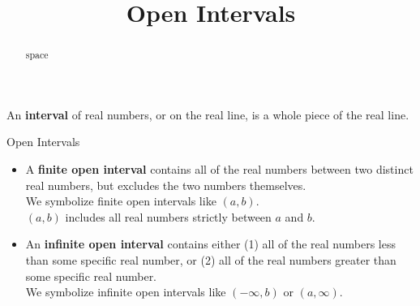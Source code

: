 \documentclass{ximera}
\title{Open Intervals}
\begin{document}
\begin{abstract}
space
\end{abstract}
\maketitle




An \textbf{interval} of real numbers, or on the real line, is a whole piece of the real line.


\begin{definition}  Open Intervals



\begin{itemize}
\item A \textbf{finite open interval} contains all of the real numbers between two distinct real numbers, but excludes the two numbers themselves.\\

We symbolize finite open intervals like $(a, b)$. \\

$(a,b)$ includes all real numbers strictly between $a$ and $b$. \\



\item An \textbf{infinite open interval} contains either (1) all of the real numbers less than some specific real number, or (2) all of the real numbers greater than some specific real number. \\

We symbolize infinite open intervals like $(-\infty, b)$ or $(a, \infty)$. \\

\end{itemize}

\end{definition}
\end{document}
